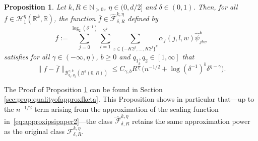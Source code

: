 \documentclass[10pt]{article}
\newtheorem{proposition}{Proposition}
\begin{document}
\begin{proposition}\label{prop:qualityofapproxfketa} Let $k,R\in \mathbb{N}_{>0}$, $\eta\in (0,d/2]$ and $\delta\in(0,1)$. Then,
    for all $f\in \mathcal{H}^{\eta}_1(\mathbb{R}^k,\mathbb{R})$, the function $\overline{f}\in \hat{\mathcal{F}}_{\delta,R}^{k,\eta}$ defined by
    $$\overline{f}:=\sum \limits_{j=0}^{\log_2(\delta^{-1})} \sum \limits_{l=1}^{2^k} \sum \limits_{z\in \{-K2^j,...,K2^j\}^k} \alpha_f(j,l,w) \hat{\psi}^k_{jlw}$$
    satisfies for all $\gamma \in (-\infty,\eta)$, $b \geq 0$ and $q_1,q_2\in [1,\infty]$ that 
    $$  \|f-\overline{f}\|_{\mathcal{B}^{\gamma,b}_{q_1,q_2}(B^k(0,R))}\leq C_{\gamma,b}R^{\frac{k}{q_1}} \big(n^{-1/2}+\log(\delta^{-1})^b\delta^{\eta-\gamma}\big).$$
\end{proposition}
The Proof of Proposition \ref{prop:qualityofapproxfketa} can be found in Section \ref{sec:prop:qualityofapproxfketa}. This Proposition shows in particular that—up to the \( n^{-1/2} \) term arising from the approximation of the scaling function in~\eqref{eq:approxipsipaper2}—the class \( \hat{\mathcal{F}}_{\delta,R}^{k,\eta} \) retains the same approximation power as the original class \( \mathcal{F}_{\delta,R}^{k,\eta} \).
\end{document}

